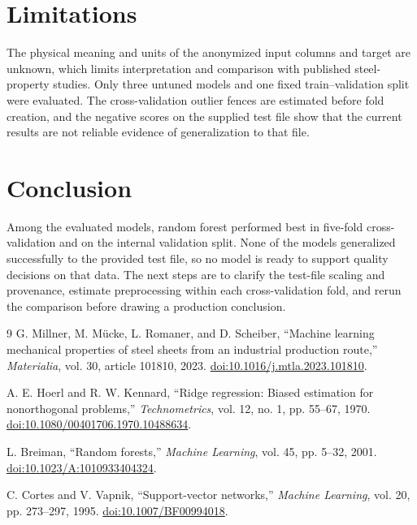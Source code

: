 \documentclass[11pt,a4paper]{article}
\begin{document}
\section{Limitations}
The physical meaning and units of the anonymized input columns and target
are unknown, which limits interpretation and comparison with published
steel-property studies. Only three untuned models and one fixed
train--validation split were evaluated. The cross-validation outlier fences
are estimated before fold creation, and the negative scores on the supplied
test file show that the current results are not reliable evidence of
generalization to that file.

\section{Conclusion}
Among the evaluated models, random forest performed best in five-fold
cross-validation and on the internal validation split. None of the models
generalized successfully to the provided test file, so no model is ready to
support quality decisions on that data. The next steps are to clarify the
test-file scaling and provenance, estimate preprocessing within each
cross-validation fold, and rerun the comparison before drawing a production
conclusion.

\begin{thebibliography}{9}
G. Millner, M. M\"ucke, L. Romaner, and D. Scheiber,
``Machine learning mechanical properties of steel sheets from an industrial
production route,'' \emph{Materialia}, vol. 30, article 101810, 2023.
\href{https://doi.org/10.1016/j.mtla.2023.101810}{doi:10.1016/j.mtla.2023.101810}.

A. E. Hoerl and R. W. Kennard,
``Ridge regression: Biased estimation for nonorthogonal problems,''
\emph{Technometrics}, vol. 12, no. 1, pp. 55--67, 1970.
\href{https://doi.org/10.1080/00401706.1970.10488634}{doi:10.1080/00401706.1970.10488634}.

L. Breiman, ``Random forests,'' \emph{Machine Learning}, vol. 45,
pp. 5--32, 2001.
\href{https://doi.org/10.1023/A:1010933404324}{doi:10.1023/A:1010933404324}.

C. Cortes and V. Vapnik, ``Support-vector networks,''
\emph{Machine Learning}, vol. 20, pp. 273--297, 1995.
\href{https://doi.org/10.1007/BF00994018}{doi:10.1007/BF00994018}.
\end{thebibliography}
\end{document}
